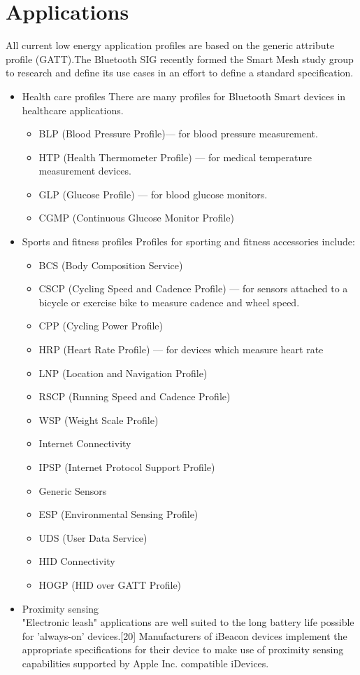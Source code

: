 \documentclass[11pt,a4paper]{article}
\begin{document}
	\section{Applications}
	{
    All current low energy application profiles are based on the generic attribute profile (GATT).The Bluetooth SIG recently formed the Smart Mesh study group to research and define its use cases in an effort to define a standard specification.
    \begin{itemize}
 \item   Health care profiles
There are many profiles for Bluetooth Smart devices in healthcare applications.
\begin{itemize}
\item BLP (Blood Pressure Profile)— for blood pressure measurement.
\item HTP (Health Thermometer Profile) — for medical temperature measurement devices.
\item GLP (Glucose Profile) — for blood glucose monitors.
\item CGMP (Continuous Glucose Monitor Profile)
\end{itemize}
\item Sports and fitness profiles
Profiles for sporting and fitness accessories include:
\begin{itemize}
\item BCS (Body Composition Service)
\item CSCP (Cycling Speed and Cadence Profile) — for sensors attached to a bicycle or exercise bike to measure cadence and wheel speed.
\item CPP (Cycling Power Profile)
\item HRP (Heart Rate Profile) — for devices which measure heart rate
\item LNP (Location and Navigation Profile)
\item RSCP (Running Speed and Cadence Profile)
\item WSP (Weight Scale Profile)
\end{itemize}
\begin{itemize}
\item Internet Connectivity
\item IPSP (Internet Protocol Support Profile)
\end{itemize}
\begin{itemize}
\item Generic Sensors
\item ESP (Environmental Sensing Profile)
\item UDS (User Data Service)
\end{itemize}
\begin{itemize}
\item HID Connectivity
\item HOGP (HID over GATT Profile)
\end{itemize}
\item Proximity sensing\\
"Electronic leash" applications are well suited to the long battery life possible for 'always-on' devices.[20] Manufacturers of iBeacon devices implement the appropriate specifications for their device to make use of proximity sensing capabilities supported by Apple Inc. compatible iDevices.


\end{itemize}}
\end{document}
